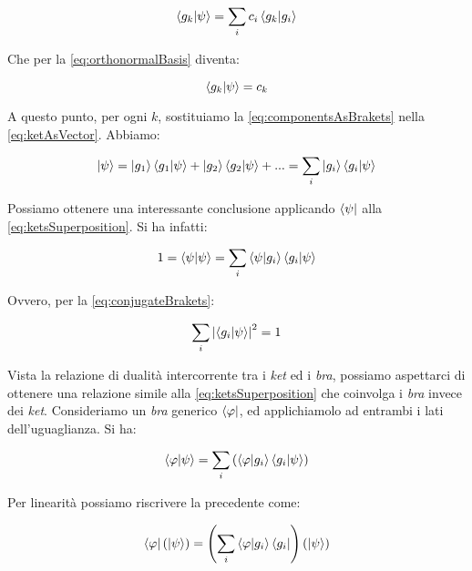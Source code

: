 	\begin{equation}
		\braket{g_k}{\psi} = \sum_i c_i \braket{g_k}{g_i}
	\end{equation}

Che per la \eqref{eq:orthonormalBasis} diventa:

	\begin{equation} \label{eq:componentsAsBrakets}
		\braket{g_k}{\psi} = c_k
	\end{equation}

A questo punto, per ogni $k$, sostituiamo la \eqref{eq:componentsAsBrakets} nella \eqref{eq:ketAsVector}. Abbiamo:

	\begin{equation} \label{eq:ketsSuperposition}
		\ket{\psi} = \ket{g_1} \braket{g_1}{\psi} + \ket{g_2} \braket{g_2}{\psi} + ... = \sum_i \ket{g_i} \braket{g_i}{\psi}
	\end{equation}

Possiamo ottenere una interessante conclusione applicando $\bra{\psi}$ alla \eqref{eq:ketsSuperposition}. Si ha infatti:

	\begin{equation}
		1 = \braket{\psi}{\psi} = \sum_i \braket{\psi}{g_i} \braket{g_i}{\psi}
	\end{equation}

Ovvero, per la \eqref{eq:conjugateBrakets}:

	\begin{equation} \label{eq:probabilitySum}
		\sum_i \left | \braket{g_i}{\psi} \right |^2 = 1
	\end{equation}

Vista la relazione di dualità intercorrente tra i \textit{ket} ed i \textit{bra}, possiamo aspettarci di ottenere una relazione simile alla \eqref{eq:ketsSuperposition} che coinvolga i \textit{bra} invece dei \textit{ket}. Consideriamo un \textit{bra} generico $\bra{\varphi}$, ed applichiamolo ad entrambi i lati dell'uguaglianza. Si ha:

	\begin{equation}
		\braket{\varphi}{\psi} = \sum_i \left( \braket{\varphi}{g_i} \braket{g_i}{\psi} \right)
	\end{equation}

Per linearità possiamo riscrivere la precedente come:

	\begin{equation} \label{eq:derivation1}
		\bra{\varphi}(\ket{\psi}) = \left( \sum_i \braket{\varphi}{g_i} \bra{g_i} \right) (\ket{\psi})
	\end{equation}

